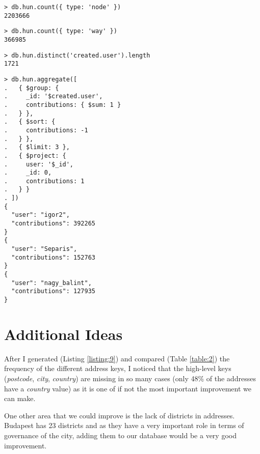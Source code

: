 \documentclass{article}
\begin{document}
\begin{multicols}{2}
\begin{lstlisting}[caption=Number of nodes.,label={listing:5}]
> db.hun.count({ type: 'node' })
2203666
\end{lstlisting}

\begin{lstlisting}[caption=Number of ways.,label={listing:6}]
> db.hun.count({ type: 'way' })
366985
\end{lstlisting}

\begin{lstlisting}[caption=Number of unique contributing users.,label={listing:7}]
> db.hun.distinct('created.user').length
1721
\end{lstlisting}

\begin{lstlisting}[caption=Top three contributing users.,label={listing:8}]
> db.hun.aggregate([
.   { $group: {
.     _id: '$created.user',
.     contributions: { $sum: 1 }
.   } },
.   { $sort: {
.     contributions: -1
.   } },
.   { $limit: 3 },
.   { $project: {
.     user: '$_id',
.     _id: 0,
.     contributions: 1
.   } }
. ])
{
  "user": "igor2",
  "contributions": 392265
}
{
  "user": "Separis",
  "contributions": 152763
}
{
  "user": "nagy_balint",
  "contributions": 127935
}
\end{lstlisting}


\section{Additional Ideas}

After I generated (Listing \ref{listing:9}) and compared (Table \ref{table:2}) the frequency of the different address keys, I noticed that the high-level keys (\textit{postcode}, \textit{city}, \textit{country}) are missing in so many cases (only 48\% of the addresses have a \textit{country} value) as it is one of if not the most important improvement we can make.

One other area that we could improve is the lack of districts in addresses. Budapest has 23 districts and as they have a very important role in terms of governance of the city, adding them to our database would be a very good improvement.



\end{multicols}
\end{document}

